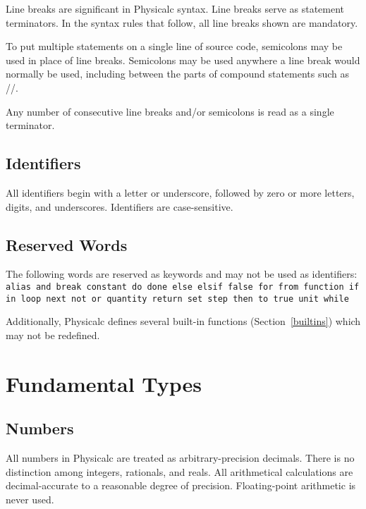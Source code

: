 Line breaks are significant in Physicalc syntax.  Line breaks serve as
statement terminators.  In the syntax rules that follow, all line
breaks shown are mandatory.

To put multiple statements on a single line of source code, semicolons
may be used in place of line breaks.  Semicolons may be used anywhere
a line break would normally be used, including between the parts of
compound statements such as //.

Any number of consecutive line breaks and/or semicolons is read as a
single terminator.


\subsection{Identifiers}

All identifiers begin with a letter or underscore, followed by zero or
more letters, digits, and underscores.  Identifiers are case-sensitive.


\subsection{Reserved Words}

The following words are reserved as keywords and may not be used as
identifiers:
{\tt
alias
and
break
constant
do
done
else
elsif
false
for
from
function
if
in
loop
next
not
or
quantity
return
set
step
then
to
true
unit
while
}

Additionally, Physicalc defines several built-in functions
(Section~\ref{builtins}) which may not be redefined.



\section{Fundamental Types}
\label{types}

\subsection{Numbers}
\label{numbers}

All numbers in Physicalc are treated as arbitrary-precision decimals.
There is no distinction among integers, rationals, and reals.  All
arithmetical calculations are decimal-accurate to a reasonable
degree of precision.  Floating-point arithmetic is never used.

